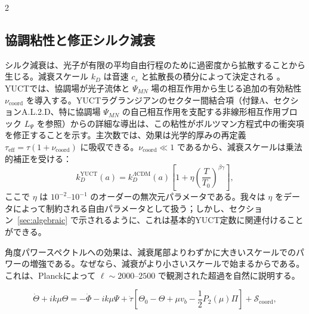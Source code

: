 \documentclass[11pt,a4paper]{article}
\begin{document}
\begin{multicols}{2}
		\subsection{協調粘性と修正シルク減衰}
		
		シルク減衰は、光子が有限の平均自由行程のために過密度から拡散することから生じる。減衰スケール \(k_D\) は音速 \(c_s\) と拡散長の積分によって決定される \cite{Silk1968}。YUCTでは、協調場が光子流体と \(\Psi_{MN}\) 場の相互作用から生じる追加の有効粘性 \(\nu_{\mathrm{coord}}\) を導入する。YUCTラグランジアンのセクター間結合項（付録A、セクションA.L.2.D、特に協調場 \(\Psi_{MN}\) の自己相互作用を支配する非線形相互作用ブロック \(L_{\Psi}\) を参照）からの詳細な導出は、この粘性がボルツマン方程式中の衝突項を修正することを示す。主次数では、効果は光学的厚みの再定義 \(\tau_{\mathrm{eff}} = \tau (1 + \nu_{\mathrm{coord}})\) に吸収できる。\(\nu_{\mathrm{coord}} \ll 1\) であるから、減衰スケールは乗法的補正を受ける：
		\begin{equation}
			k_D^{\text{YUCT}}(a) = k_D^{\Lambda\text{CDM}}(a) \left[1 + \eta \left(\frac{T}{T_0}\right)^{\beta\gamma}\right],
			\label{eq:kD}
		\end{equation}
		ここで \(\eta\) は \(10^{-2}\)--\(10^{-1}\) のオーダーの無次元パラメータである。我々は \(\eta\) をデータによって制約される自由パラメータとして扱う；しかし、セクション~\ref{sec:algebraic} で示されるように、これは基本的YUCT定数に関連付けることができる。
		
		角度パワースペクトルへの効果は、減衰尾部よりわずかに大きいスケールでのパワーの増強である。なぜなら、減衰がより小さいスケールで始まるからである。これは、Planckによって \(\ell \sim 2000\)--\(2500\) で観測された超過を自然に説明する。
		
	\end{multicols}
	
	\begin{equation}
		\dot{\Theta} + ik\mu\Theta = -\dot{\Phi} - ik\mu\Psi + \dot{\tau}\left[\Theta_0 - \Theta + \mu v_b - \frac{1}{2}P_2(\mu)\Pi\right] + \mathcal{S}_{\mathrm{coord}},
		\label{eq:boltzmann}
	\end{equation}
	
\end{document}

